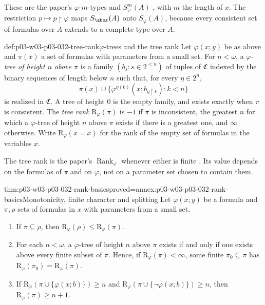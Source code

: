 These are the paper's \(\varphi\)-\(m\)-types and \(S^m_\varphi(A)\)
\cite[Definition~2.1, p.~297]{Shelah1971Stability}, with \(m\) the length of
\(x\).  The restriction \(p\mapsto p\mathbin{\upharpoonright}\varphi\) maps
\(S_{\abs x}(A)\) onto \(S_\varphi(A)\), because every consistent set of
formulas over \(A\) extends to a complete type over \(A\).

\begin{hbdefinition}{def:p03-w03-p03-032-tree-rank}{\(\varphi\)-trees and the tree rank}
Let \(\varphi(x;y)\) be as above and \(\pi(x)\) a set of formulas with
parameters from a small set.  For \(n<\omega\), a \emph{\(\varphi\)-tree of
height \(n\) above \(\pi\)} is a family \((b_s:s\in 2^{<n})\) of tuples of
\(\mathfrak C\) indexed by the binary sequences of length below \(n\) such
that, for every \(\eta\in 2^n\),
\[
  \pi(x)\cup\{\varphi^{\eta(k)}(x;b_{\eta\mathbin{\upharpoonright}k}):k<n\}
\]
is realized in \(\mathfrak C\).  A tree of height \(0\) is the empty family,
and exists exactly when \(\pi\) is consistent.  The \emph{tree rank}
\(\mathrm R_\varphi(\pi)\) is \(-1\) if \(\pi\) is inconsistent, the greatest
\(n\) for which a \(\varphi\)-tree of height \(n\) above \(\pi\) exists if
there is a greatest one, and \(\infty\) otherwise.  Write
\(\mathrm R_\varphi(x=x)\) for the rank of the empty set of formulas in the
variables \(x\).
\end{hbdefinition}

The tree rank is the paper's \(\operatorname{Rank}_\varphi\) whenever either
is finite \cite[Lemma~2.7, p.~301]{Shelah1971Stability}.  Its value depends
on the formulas of \(\pi\) and on \(\varphi\), not on a parameter set chosen
to contain them.

\begin{hblemma}{thm:p03-w03-p03-032-rank-basics}{proved=annex:p03-w03-p03-032-rank-basics}{Monotonicity, finite character and splitting}
Let \(\varphi(x;y)\) be a formula and \(\pi,\rho\) sets of formulas in
\(x\) with parameters from a small set.
\begin{enumerate}
  \item If \(\pi\subseteq\rho\), then
        \(\mathrm R_\varphi(\rho)\leq\mathrm R_\varphi(\pi)\).
  \item For each \(n<\omega\), a \(\varphi\)-tree of height \(n\) above
        \(\pi\) exists if and only if one exists above every finite subset of
        \(\pi\).  Hence, if \(\mathrm R_\varphi(\pi)<\infty\), some finite
        \(\pi_0\subseteq\pi\) has
        \(\mathrm R_\varphi(\pi_0)=\mathrm R_\varphi(\pi)\).
  \item If \(\mathrm R_\varphi(\pi\cup\{\varphi(x;b)\})\geq n\) and
        \(\mathrm R_\varphi(\pi\cup\{\neg\varphi(x;b)\})\geq n\), then
        \(\mathrm R_\varphi(\pi)\geq n+1\).
\end{enumerate}
\end{hblemma}

